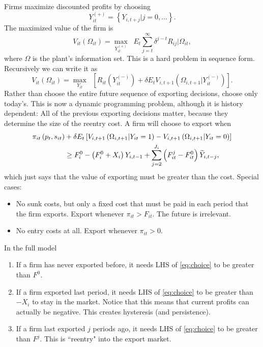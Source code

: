 \documentclass[11pt, pdftex]{article}
\begin{document}
Firms maximize discounted profits by choosing
\begin{equation}
    Y_{it}^{(+)} = \left\{ Y_{i,t+j} \vert j=0,\dots\right\}.
\end{equation}
The maximized value of the firm is
\begin{equation}
    V_{it}\left(\Omega_{it} \right) = \max_{Y_{it}^{(+)}} \; \; E_t \sum_{j=t}^\infty \delta^{j-t}R_{ij}\vert \Omega_{it},
\end{equation}
where $\Omega$ is the plant's information set.  This is a hard problem in sequence form.  Recursively we can write it as
\begin{equation}
    V_{it}\left(\Omega_{it} \right) = \max_{Y_{it}} \; \; \left[R_{it}\left( Y_{it}^{(-)} \right) + \delta E_t V_{i,t+1}\left(\Omega_{i,t+1} \vert Y_{it}^{(-)} \right)  \right].
\end{equation}
Rather than choose the entire future sequence of exporting decisions, choose only today's.  This is now a dynamic programming problem, although it is history dependent: All of the previous exporting decisions matter, because they determine the size of  the reentry cost. A firm will choose to export when
\begin{align} \label{eq:choice}
    \pi_{it}\left(p_t,s_{it} \right) &+ \delta E_t  \left[ V_{i,t+1}\left(\Omega_{i,t+1} \vert Y_{it}=1 \right) - V_{i,t+1}\left(\Omega_{i,t+1} \vert Y_{it}=0 \right) \right] \\
     &\geq F_i^0 -\left(F_i^0+X_i \right)Y_{i,t-1}+\sum_{j=2}^{J_i}\left(F_{it}^j - F_{it}^0 \right)\widetilde{Y}_{i,t-j}, \notag
\end{align}
which just says that the value of exporting must be greater than the cost. Special cases:
\begin{itemize}
  \item No sunk costs, but only a fixed cost that must be paid in each period that the firm exports.  Export whenever $\pi_{it} > F_{it}$.  The future is irrelevant.
  \item No entry costs at all.  Export whenever $\pi_{it} > 0$.
\end{itemize}
In the full model
\begin{enumerate}
  \item If a firm has never exported before, it needs LHS of \eqref{eq:choice} to be greater than $F^0$.
  \item If a firm exported last period, it needs LHS of \eqref{eq:choice} to be greater than $-X_i$ to stay in the market.  Notice that this means that current profits can actually be negative. This creates hysteresis (and persistence).
  \item If a firm last exported $j$ periods ago, it needs LHS of \eqref{eq:choice} to be greater than $F^j$. This is ``reentry" into the export market.
\end{enumerate}
\end{document}
